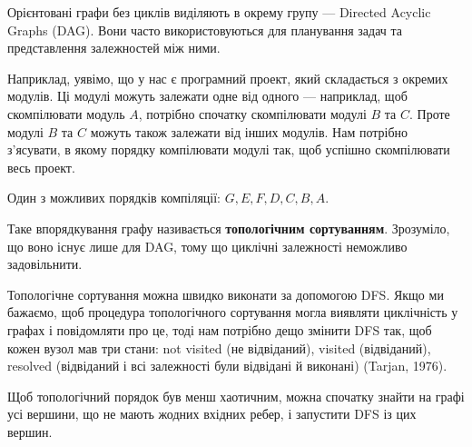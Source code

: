 \documentclass[12pt,a4paper]{report}
\begin{document}
Орієнтовані графи без циклів виділяють в окрему групу --- Directed Acyclic Graphs (DAG). Вони часто використовуються для планування задач та представлення залежностей між ними.

Наприклад, уявімо, що у нас є програмний проект, який складається з окремих модулів. Ці модулі можуть залежати одне від одного --- наприклад, щоб скомпілювати модуль \(A\), потрібно спочатку скомпілювати модулі \(B\) та \(C\). Проте модулі \(B\) та \(C\) можуть також залежати від інших модулів. Нам потрібно з’ясувати, в якому порядку компілювати модулі так, щоб успішно скомпілювати весь проект.

\begin{center}
\end{center}

Один з можливих порядків компіляції: \(G, E, F, D, C, B, A\).

Таке впорядкування графу називається \textbf{топологічним сортуванням}. Зрозуміло, що воно існує лише для DAG, тому що циклічні залежності неможливо задовільнити.

Топологічне сортування можна швидко виконати за допомогою DFS. Якщо ми бажаємо, щоб процедура топологічного сортування могла виявляти циклічність у графах і повідомляти про це, тоді нам потрібно дещо змінити DFS так, щоб кожен вузол мав три стани: not visited (не відвіданий), visited (відвіданий), resolved (відвіданий і всі залежності були відвідані й виконані) (Tarjan, 1976).

Щоб топологічний порядок був менш хаотичним, можна спочатку знайти на графі усі вершини, що не мають жодних вхідних ребер, і запустити DFS із цих вершин.
\end{document}
